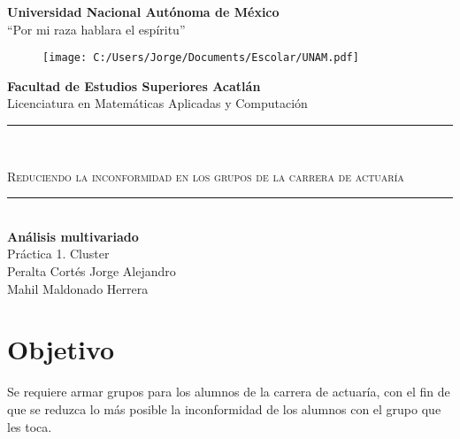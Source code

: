 \documentclass[12pt]{article}
\begin{document}
\begin{titlepage}
\begin{center}
{\huge \textbf{Universidad Nacional Aut\'onoma de M\'exico}}\\
\vspace{3mm}
{\LARGE {``Por mi raza hablara el espíritu''}}\\
\vspace{3mm}
\begin{figure}[h]
\centering
\texttt{[image: C:/Users/Jorge/Documents/Escolar/UNAM.pdf]}
\end{figure}
{\LARGE \textbf{Facultad de Estudios Superiores Acatlán}}\\
\vspace{3mm}
{\LARGE Licenciatura en Matemáticas Aplicadas y Computación}\\
\vspace{5mm}
\textcolor{oro}{\rule{\linewidth}{1mm}} \\
\vspace{2mm}
\begin{spacing}{1.5}
{\LARGE \textsc{Reduciendo la inconformidad en los grupos de la carrera de actuaría}} %
\end{spacing}
\textcolor{oro}{\rule{\linewidth}{1mm}} \\
\vspace{1cm}
{\LARGE \textbf{Análisis multivariado}}\\ %
\vspace{5mm}
{\LARGE Práctica 1. Cluster}\\ %
\vspace{5mm}
\vspace{4mm}
\vspace{4mm}
{\LARGE {Peralta Cortés Jorge Alejandro}}\\ %
\vspace{4mm}
\vspace{4mm}
\vspace{1cm}
{\LARGE {Mahil Maldonado Herrera}}\\ %
\end{center}
\end{titlepage}

\newpage

\tableofcontents

\newpage

\section*{Objetivo}
Se requiere armar grupos para los alumnos de la carrera de actuaría, con el fin de que se reduzca lo más posible la
inconformidad de los alumnos con el grupo que les toca.
\end{document}
